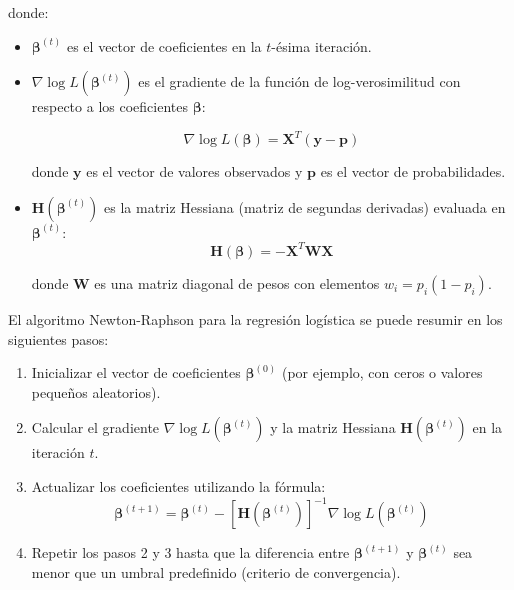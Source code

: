 donde:
\begin{itemize}
    \item $\boldsymbol{\beta}^{(t)}$ es el vector de coeficientes en la $t$-ésima iteración.
    \item $\nabla \log L(\boldsymbol{\beta}^{(t)})$ es el gradiente de la función de log-verosimilitud con respecto a los coeficientes $\boldsymbol{\beta}$:

\begin{equation}
\nabla \log L(\boldsymbol{\beta}) = \mathbf{X}^T (\mathbf{y} - \mathbf{p})
\end{equation}

donde $\mathbf{y}$ es el vector de valores observados y $\mathbf{p}$ es el vector de probabilidades.
    \item $\mathbf{H}(\boldsymbol{\beta}^{(t)})$ es la matriz Hessiana (matriz de segundas derivadas) evaluada en $\boldsymbol{\beta}^{(t)}$:
\begin{equation}
\mathbf{H}(\boldsymbol{\beta}) = -\mathbf{X}^T \mathbf{W} \mathbf{X}
\end{equation}

donde $\mathbf{W}$ es una matriz diagonal de pesos con elementos $w_i = p_i (1 - p_i)$.

\end{itemize}


\begin{Algthm}
El algoritmo Newton-Raphson para la regresión logística se puede resumir en los siguientes pasos:
\begin{enumerate}
    \item Inicializar el vector de coeficientes $\boldsymbol{\beta}^{(0)}$ (por ejemplo, con ceros o valores pequeños aleatorios).
    \item Calcular el gradiente $\nabla \log L(\boldsymbol{\beta}^{(t)})$ y la matriz Hessiana $\mathbf{H}(\boldsymbol{\beta}^{(t)})$ en la iteración $t$.
    \item Actualizar los coeficientes utilizando la fórmula:
    \begin{equation}
    \boldsymbol{\beta}^{(t+1)} = \boldsymbol{\beta}^{(t)} - \left[ \mathbf{H}(\boldsymbol{\beta}^{(t)}) \right]^{-1} \nabla \log L(\boldsymbol{\beta}^{(t)})
    \end{equation}
    \item Repetir los pasos 2 y 3 hasta que la diferencia entre $\boldsymbol{\beta}^{(t+1)}$ y $\boldsymbol{\beta}^{(t)}$ sea menor que un umbral predefinido (criterio de convergencia).
\end{enumerate}
\end{Algthm}

